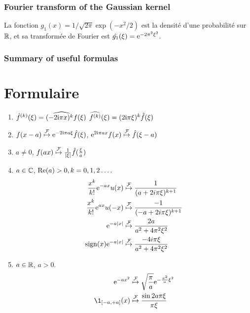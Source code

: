 \begin{frame}
\frametitle{Fourier transform of the Gaussian kernel}
\begin{lemma}\label{lem:gaussenneTF}
La fonction  $g_1(x)= 1 / \sqrt{2\pi} \exp( -x^2/2)$ est la densit{\'e} d'une probabilit{\'e} sur $\mathbb{R}$, et sa transform{\'e}e de Fourier
est $\hat{g_1}(\xi)= \mathrm{e}^{- 2 \pi^2 \xi^2}$.
\end{lemma}
\end{frame}

\begin{frame}
\frametitle{Summary of useful formulas}
\section{Formulaire}
\label{sec:formulaire}
\begin{enumerate}[label=(\roman*)]
\item $\hat{f}^{(k)}(\xi)= \widehat{(-2\mathrm{i}\pi x)^{k}f}(\xi)$
$\widehat{f^{(k)}}(\xi)=(2\mathrm{i} \pi\xi)^{k}\hat{f}(\xi)$
\item $f(x-a) \stackrel{\mathcal{F}}{\mapsto} \mathrm{e}^{-2\mathrm{i} \pi a\xi}\hat{f}(\xi)$,
$\mathrm{e}^{2 \mathrm{i} \pi ax}f(x)\stackrel{\mathcal{F}}{\mapsto} \hat{f}(\xi-a)$
\item $a\neq 0$, $ f(ax)\stackrel{\mathcal{F}}{\mapsto} \frac{1}{|\xi|}\hat{f}(\frac{\xi}{a})$
\item  $a\in \mathbb{C}$, ${\rm Re}(a)>0, k=0,1,2\ldots.$
\begin{align*}
\frac{x^{k}}{k!}\mathrm{e}^{-ax}u(x) &\stackrel{\mathcal{F}}{\mapsto} \frac{1}{(a+2i\pi\xi)^{k+1}} \\
\frac{x^{k}}{k!}\mathrm{e}^{ax}u(-x) &\stackrel{\mathcal{F}}{\mapsto} \frac{-1}{(-a+2i\pi\xi)^{k+1}} \\
\mathrm{e}^{-a|x|} &\stackrel{\mathcal{F}}{\mapsto} \frac{2a}{a^{2}+4\pi^{2}\xi^{2}} \\
\mathrm{sign}(x)\mathrm{e}^{-a|x|} &\stackrel{\mathcal{F}}{\mapsto} \frac{-4i\pi\xi}{a^{2}+4\pi^{2}\xi^{2}} \\
\end{align*}
\item  $a\in \mathbb{R}$, $a>0$.
\begin{align*}
\rme^{-ax^{2}}  &\TFyield \sqrt{\frac{\pi}{a}}\rme^{-\frac{\pi^{2}}{a}\xi^{2}} \\
\1_{\ccint{-a,+a}}(x) &\TFyield \frac{\sin 2a\pi\xi}{\pi\xi}
\end{align*}
\end{enumerate}

\end{frame}

